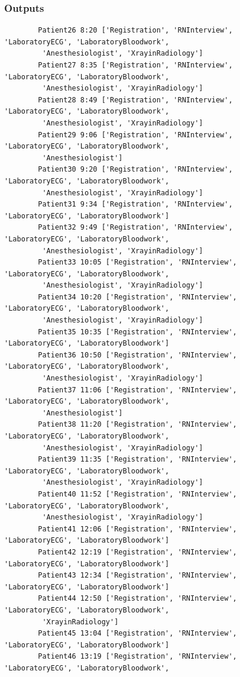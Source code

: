 \documentclass[12pt]{article}
\begin{document}
		\subsubsection{Outputs}
		\begin{verbatim}
		Patient26 8:20 ['Registration', 'RNInterview', 'LaboratoryECG', 'LaboratoryBloodwork',
		 'Anesthesiologist', 'XrayinRadiology']
		Patient27 8:35 ['Registration', 'RNInterview', 'LaboratoryECG', 'LaboratoryBloodwork',
		 'Anesthesiologist', 'XrayinRadiology']
		Patient28 8:49 ['Registration', 'RNInterview', 'LaboratoryECG', 'LaboratoryBloodwork',
		 'Anesthesiologist', 'XrayinRadiology']
		Patient29 9:06 ['Registration', 'RNInterview', 'LaboratoryECG', 'LaboratoryBloodwork',
		 'Anesthesiologist']
		Patient30 9:20 ['Registration', 'RNInterview', 'LaboratoryECG', 'LaboratoryBloodwork',
		 'Anesthesiologist', 'XrayinRadiology']
		Patient31 9:34 ['Registration', 'RNInterview', 'LaboratoryECG', 'LaboratoryBloodwork']
		Patient32 9:49 ['Registration', 'RNInterview', 'LaboratoryECG', 'LaboratoryBloodwork',
		 'Anesthesiologist', 'XrayinRadiology']
		Patient33 10:05 ['Registration', 'RNInterview', 'LaboratoryECG', 'LaboratoryBloodwork',
		 'Anesthesiologist', 'XrayinRadiology']
		Patient34 10:20 ['Registration', 'RNInterview', 'LaboratoryECG', 'LaboratoryBloodwork',
		 'Anesthesiologist', 'XrayinRadiology']
		Patient35 10:35 ['Registration', 'RNInterview', 'LaboratoryECG', 'LaboratoryBloodwork']
		Patient36 10:50 ['Registration', 'RNInterview', 'LaboratoryECG', 'LaboratoryBloodwork',
		 'Anesthesiologist', 'XrayinRadiology']
		Patient37 11:06 ['Registration', 'RNInterview', 'LaboratoryECG', 'LaboratoryBloodwork',
		 'Anesthesiologist']
		Patient38 11:20 ['Registration', 'RNInterview', 'LaboratoryECG', 'LaboratoryBloodwork',
		 'Anesthesiologist', 'XrayinRadiology']
		Patient39 11:35 ['Registration', 'RNInterview', 'LaboratoryECG', 'LaboratoryBloodwork',
		 'Anesthesiologist', 'XrayinRadiology']
		Patient40 11:52 ['Registration', 'RNInterview', 'LaboratoryECG', 'LaboratoryBloodwork',
		 'Anesthesiologist', 'XrayinRadiology']
		Patient41 12:06 ['Registration', 'RNInterview', 'LaboratoryECG', 'LaboratoryBloodwork']
		Patient42 12:19 ['Registration', 'RNInterview', 'LaboratoryECG', 'LaboratoryBloodwork']
		Patient43 12:34 ['Registration', 'RNInterview', 'LaboratoryECG', 'LaboratoryBloodwork']
		Patient44 12:50 ['Registration', 'RNInterview', 'LaboratoryECG', 'LaboratoryBloodwork',
		 'XrayinRadiology']
		Patient45 13:04 ['Registration', 'RNInterview', 'LaboratoryECG', 'LaboratoryBloodwork']
		Patient46 13:19 ['Registration', 'RNInterview', 'LaboratoryECG', 'LaboratoryBloodwork',

\end{verbatim}
\end{document}
